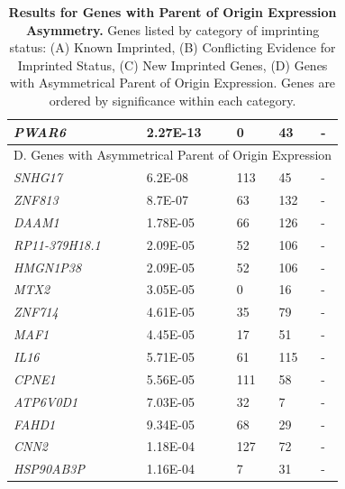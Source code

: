 \begin{table}
\begin{adjustbox}{width={\textwidth}}
\begin{tabular}{@{}p{3cm}|p{2cm}p{5cm}p{5cm}p{6cm}@{}}
 \emph{PWAR6} & 2.27E-13 & 0 & 43 & - \\ \midrule
 \multicolumn{5}{c}{D. Genes with Asymmetrical Parent of Origin Expression}  \\ \midrule
 \emph{SNHG17} & 6.2E-08 & 113 & 45 & - \\
 \emph{ZNF813} & 8.7E-07 & 63 & 132 & - \\
 \emph{DAAM1} & 1.78E-05 & 66 & 126 & -\\
 \emph{RP11-379H18.1} & 2.09E-05 & 52 & 106 & - \\
 \emph{HMGN1P38} & 2.09E-05 & 52 & 106 & - \\
 \emph{MTX2} & 3.05E-05 & 0 & 16 & - \\
\emph{ZNF714} & 4.61E-05 & 35 & 79 & - \\
\emph{MAF1} & 4.45E-05 & 17 & 51 & - \\
\emph{IL16} & 5.71E-05 & 61 & 115 & - \\
\emph{CPNE1} & 5.56E-05 & 111 & 58 & - \\
\emph{ATP6V0D1} & 7.03E-05 & 32 & 7  & - \\
\emph{FAHD1} & 9.34E-05 & 68 & 29 & - \\
\emph{CNN2} & 1.18E-04 & 127 & 72 & -\\
\emph{HSP90AB3P} & 1.16E-04 & 7 & 31 & - \\ \bottomrule
\end{tabular}
\end{adjustbox}
\caption[Results for Genes with Parent of Origin Expression Asymmetry. ]{\textbf{Results for Genes with Parent of Origin Expression Asymmetry. }
Genes listed by category of imprinting status: (A) Known Imprinted, (B) Conflicting Evidence for Imprinted Status, (C) New Imprinted Genes, (D) Genes with Asymmetrical Parent of Origin Expression. Genes are ordered by significance within each category.}
\label{tab:imprintedgenes}
\end{table}




